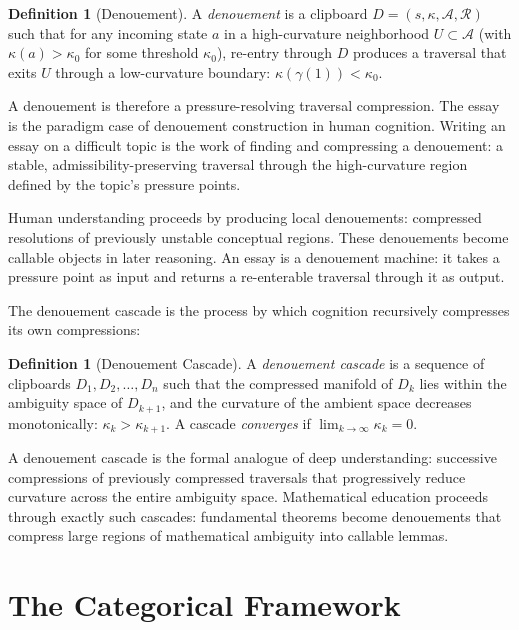 \documentclass[12pt,oneside]{book}
\newcounter{thesisctr}
\newenvironment{thesis}[1][]{%
  \refstepcounter{thesisctr}%
  \begin{tcolorbox}[
    enhanced,
    breakable,
    colback=cliplight,
    colframe=clipblue,
    fonttitle=\bfseries\small,
    title={Thesis~\thethesisctr\ifx&#1&\else~(#1)\fi},
    left=6pt, right=6pt, top=4pt, bottom=4pt,
    arc=2pt
  ]
}{%
  \end{tcolorbox}
}
\theoremstyle{plain}
\theoremstyle{definition}
\newtheorem{definition}[theorem]{Definition}
\theoremstyle{plain}
\newcommand{\cA}{\mathcal{A}}
\newcommand{\cR}{\mathcal{R}}
\begin{document}
\begin{definition}[Denouement]
A \emph{denouement} is a clipboard $D = (s, \kappa, \cA, \cR)$ such that for any incoming state $a$ in a high-curvature neighborhood $U \subset \cA$ (with $\kappa(a) > \kappa_0$ for some threshold $\kappa_0$), re-entry through $D$ produces a traversal that exits $U$ through a low-curvature boundary: $\kappa(\gamma(1)) < \kappa_0$.
\end{definition}

A denouement is therefore a pressure-resolving traversal compression. The essay is the paradigm case of denouement construction in human cognition. Writing an essay on a difficult topic is the work of finding and compressing a denouement: a stable, admissibility-preserving traversal through the high-curvature region defined by the topic's pressure points.

\begin{thesis}[Denouement Compression]
Human understanding proceeds by producing local denouements: compressed resolutions of previously unstable conceptual regions. These denouements become callable objects in later reasoning. An essay is a denouement machine: it takes a pressure point as input and returns a re-enterable traversal through it as output.
\end{thesis}

The denouement cascade is the process by which cognition recursively compresses its own compressions:

\begin{definition}[Denouement Cascade]
A \emph{denouement cascade} is a sequence of clipboards $D_1, D_2, \ldots, D_n$ such that the compressed manifold of $D_k$ lies within the ambiguity space of $D_{k+1}$, and the curvature of the ambient space decreases monotonically: $\kappa_k > \kappa_{k+1}$. A cascade \emph{converges} if $\lim_{k \to \infty} \kappa_k = 0$.
\end{definition}

A denouement cascade is the formal analogue of deep understanding: successive compressions of previously compressed traversals that progressively reduce curvature across the entire ambiguity space. Mathematical education proceeds through exactly such cascades: fundamental theorems become denouements that compress large regions of mathematical ambiguity into callable lemmas.

\part{The Categorical Framework}
\end{document}

